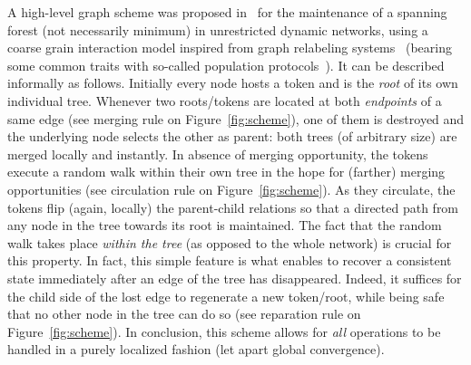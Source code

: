 \documentclass[twocolumn]{article}
\begin{document}
A high-level graph scheme was proposed in~\cite{CCGP13} for the maintenance of a spanning forest (not necessarily minimum) in unrestricted dynamic networks, using a coarse grain interaction model inspired from graph relabeling systems~\cite{GRS01} (bearing some common traits with so-called population protocols~\cite{AAD+06}). It can be described informally as follows. Initially every node hosts a token and is the {\em root} of its own individual tree. Whenever two roots/tokens are located at both {\em endpoints} of a same edge (see merging rule on Figure~\ref{fig:scheme}), one of them is destroyed and the underlying node selects the other as parent: both trees (of arbitrary size) are merged locally and instantly. In absence of merging opportunity, the tokens execute a random walk within their own tree in the hope for (farther) merging opportunities (see circulation rule on Figure~\ref{fig:scheme}). As they circulate, the tokens flip (again, locally) the parent-child relations so that a directed path from any node in the tree towards its root is maintained. The fact that the random walk takes place {\em within the tree} (as opposed to the whole network) is crucial for this property. In fact, this simple feature is what enables to recover a consistent state immediately after an edge of the tree has disappeared. Indeed, it suffices for the child side of the lost edge to regenerate a new token/root, while being safe that no other node in the tree can do so (see reparation rule on Figure~\ref{fig:scheme}). In conclusion, this scheme allows for {\em all} operations to be handled in a purely localized fashion (let apart global convergence).
\end{document}
